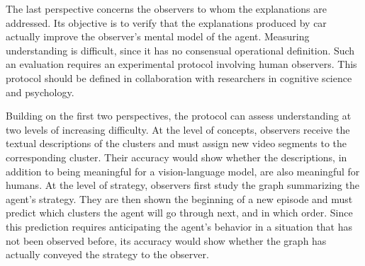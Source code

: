The last perspective concerns the observers to whom the explanations are addressed.
Its objective is to verify that the explanations produced by \gls{car} actually improve the observer's mental model of the agent.
Measuring understanding is difficult, since it has no consensual operational definition.
Such an evaluation requires an experimental protocol involving human observers.
This protocol should be defined in collaboration with researchers in cognitive science and psychology.

Building on the first two perspectives, the protocol can assess understanding at two levels of increasing difficulty.
At the level of concepts, observers receive the textual descriptions of the clusters and must assign new video segments to the corresponding cluster.
Their accuracy would show whether the descriptions, in addition to being meaningful for a vision-language model, are also meaningful for humans.
At the level of strategy, observers first study the graph summarizing the agent's strategy.
They are then shown the beginning of a new episode and must predict which clusters the agent will go through next, and in which order.
Since this prediction requires anticipating the agent's behavior in a situation that has not been observed before, its accuracy would show whether the graph has actually conveyed the strategy to the observer.